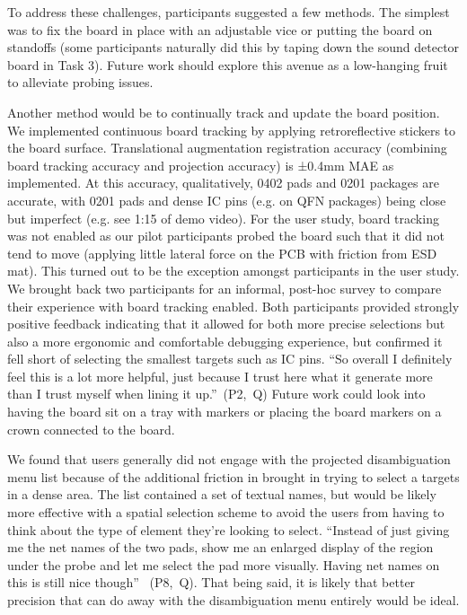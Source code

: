 \documentclass [11pt, proquest] {uwthesis}[2020/02/24]
\newcounter{sharc}
\newcommand{\sharcHere}[1]{Q\refstepcounter{sharc}\arabic{sharc}\label{#1}}
\begin{document}
To address these challenges, participants suggested a few methods. The simplest was to fix the board in place with an adjustable vice or putting the board on standoffs (some participants naturally did this by taping down the sound detector board in Task 3).
Future work should explore this avenue as a low-hanging fruit to alleviate probing issues.  

Another method would be to continually track and update the board position.
{We implemented continuous board tracking by applying retroreflective stickers to the board surface. Translational augmentation registration accuracy (combining board tracking accuracy and projection accuracy) is ±0.4mm MAE as implemented. At this accuracy, qualitatively, 0402 pads and 0201 packages are accurate, with 0201 pads and dense IC pins (e.g. on QFN packages) being close but imperfect (e.g. see 1:15 of demo video). For the user study, board tracking was not enabled as our pilot participants probed the board such that it did not tend to move (applying little lateral force on the PCB with friction from ESD mat). This turned out to be the exception amongst participants in the user study. We brought back two participants for an informal, post-hoc survey to compare their experience with board tracking enabled. Both participants provided strongly positive feedback indicating that it allowed for both more precise selections but also a more ergonomic and comfortable debugging experience, but confirmed it fell short of selecting the smallest targets such as IC pins.}
``So overall I definitely feel this is a lot more helpful, just because I trust here what it generate more than I trust myself when lining it up.''~(P2,~\sharcHere{q:reservations})
Future work could look into having the board sit on a tray with markers or placing the board markers on a crown connected to the board.

We found that users generally did not engage with the projected disambiguation menu list because of the additional friction in brought in trying to select a targets in a dense area. The list contained a set of textual names, but would be likely more effective with a spatial selection scheme to avoid the users from having to think about the type of element they're looking to select. ``Instead of just giving me the net names of the two pads, show me an enlarged display of the region under the probe and let me select the pad more visually. Having net names on this is still nice though'' ~(P8,~\sharcHere{q:disambiguation_menu_1}). That being said, it is likely that better precision that can do away with the disambiguation menu entirely would be ideal.
\end{document}
